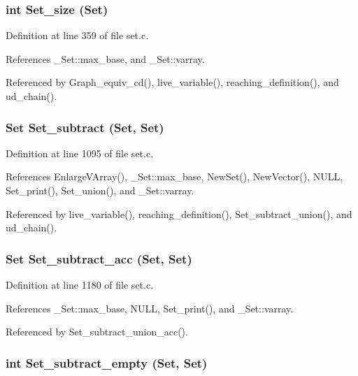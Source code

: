\subsubsection{\setlength{\rightskip}{0pt plus 5cm}int Set\_\-size (\bf{Set})}\label{set_8h_3526a6ee2480ad4ffdf88e2fb2fb2d74}




Definition at line 359 of file set.c.

References \_\-Set::max\_\-base, and \_\-Set::varray.

Referenced by Graph\_\-equiv\_\-cd(), live\_\-variable(), reaching\_\-definition(), and ud\_\-chain().
\subsubsection{\setlength{\rightskip}{0pt plus 5cm}\bf{Set} Set\_\-subtract (\bf{Set}, \bf{Set})}\label{set_8h_2373160ae59d3beb1139c48cadc16057}




Definition at line 1095 of file set.c.

References Enlarge\-VArray(), \_\-Set::max\_\-base, New\-Set(), New\-Vector(), NULL, Set\_\-print(), Set\_\-union(), and \_\-Set::varray.

Referenced by live\_\-variable(), reaching\_\-definition(), Set\_\-subtract\_\-union(), and ud\_\-chain().
\subsubsection{\setlength{\rightskip}{0pt plus 5cm}\bf{Set} Set\_\-subtract\_\-acc (\bf{Set}, \bf{Set})}\label{set_8h_208db72dcc4c3c0faeae0be802c1e519}




Definition at line 1180 of file set.c.

References \_\-Set::max\_\-base, NULL, Set\_\-print(), and \_\-Set::varray.

Referenced by Set\_\-subtract\_\-union\_\-acc().
\subsubsection{\setlength{\rightskip}{0pt plus 5cm}int Set\_\-subtract\_\-empty (\bf{Set}, \bf{Set})}\label{set_8h_f4d6ca8f96c9bea307f38ae2b9935d78}




